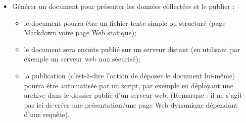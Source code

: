 {\begin{itemize}
\begin{itemize}
  \item
    extraire des statistiques (moyennes, histogrammes);
  \item
    produire des représentations graphiques (nuage de mots, tableaux
    comparatifs).
  \end{itemize}
\item
  Générer un document pour présenter les données collectées et le
  publier :
  \begin{itemize}
  \item
    le document pourra être un fichier texte simple ou structuré (page
    Markdown voire page Web statique);
  \item
    le document sera ensuite publié sur un serveur distant (en utilisant
    par exemple un serveur web non
    sécurisé);
  \item
    la publication (c'est-à-dire l'action de déposer le document
    lui-même) pourra être automatisée par
    un script, par exemple en déployant une archive dans le dossier
    public d'un serveur web. (Remarque :
    il ne s'agit pas ici de créer une présentation/une page Web
    dynamique dépendant d'une requête).
  \end{itemize}
\end{itemize}
}




